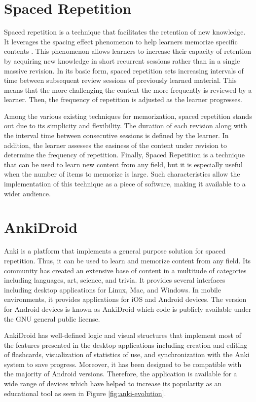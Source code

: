 \section{Spaced Repetition}
Spaced repetition is a technique that facilitates the retention of new knowledge. It leverages the spacing effect phenomenon to help learners memorize specific contents \citep{hintzman1974theoretical}. This phenomenon allows learners to increase their capacity of retention by acquiring new knowledge in short recurrent sessions rather than in a single massive revision. In its basic form, spaced repetition sets increasing intervals of time between subsequent review sessions of previously learned material. This means that the more challenging the content the more frequently is reviewed by a learner. Then, the frequency of repetition is adjusted as the learner progresses.

Among the various existing techniques for memorization, spaced repetition stands out due to its simplicity and flexibility. The duration of each revision along with the interval time between consecutive sessions is defined by the learner. In addition, the learner assesses the easiness of the content under revision to determine the frequency of repetition. Finally, Spaced Repetition is a technique that can be used to learn new content from any field, but it is especially useful when the number of items to memorize is large. Such characteristics allow the implementation of this technique as a piece of software, making it available to a wider audience.

\section{AnkiDroid}
Anki is a platform that implements a general purpose solution for spaced repetition. Thus, it can be used to learn and memorize content from any field. Its community has created an extensive base of content in a multitude of categories including languages, art, science, and trivia. It provides several interfaces including desktop applications for Linux, Mac, and Windows. In mobile environments, it provides applications for iOS and Android devices. The version for Android devices is known as AnkiDroid which code is publicly available under the GNU general public license.

AnkiDroid has well-defined logic and visual structures \citep{zamora2011ankidroid} that implement most of the features presented in the desktop applications including creation and editing of flashcards, visualization of statistics of use, and synchronization with the Anki system to save progress. Moreover, it has been designed to be compatible with the majority of Android versions. Therefore, the application is available for a wide range of devices which have helped to increase its popularity as an educational tool as seen in Figure \ref{fig:anki-evolution}.

